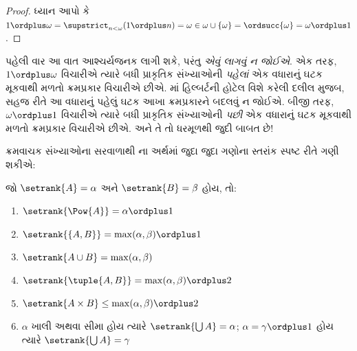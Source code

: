\begin{proof}
ધ્યાન આપો કે $1 \ordplus  \omega = \supstrict_{n < \omega} (1 \ordplus n)
= \omega \in \omega \cup \{\omega\} = \ordsucc{\omega} = \omega
\ordplus  1$.
\end{proof}
\noindent
પહેલી વાર આ વાત આશ્ચર્યજનક લાગી શકે, પરંતુ
\emph{એવું લાગવું ન જોઈએ}. એક તરફ,
$1 \ordplus  \omega$ વિચારીએ ત્યારે બધી પ્રાકૃતિક
સંખ્યાઓની \emph{પહેલાં} એક વધારાનું ઘટક મૂકવાથી
મળતો ક્રમપ્રકાર વિચારીએ છીએ.
માં હિલ્બર્ટની હોટેલ
વિશે કરેલી દલીલ મુજબ, સહજ રીતે આ વધારાનું પહેલું
ઘટક આખા ક્રમપ્રકારને બદલવું ન જોઈએ. બીજી તરફ,
$\omega \ordplus  1$ વિચારીએ ત્યારે બધી પ્રાકૃતિક
સંખ્યાઓની \emph{પછી} એક વધારાનું ઘટક મૂકવાથી
મળતો ક્રમપ્રકાર વિચારીએ છીએ. અને તે તો ધરમૂળથી
જુદી બાબત છે!
\endgroup

\begingroup
\makeatletter{}\makeatother

\label{guunit:OLP-0577}


ક્રમવાચક સંખ્યાઓના સરવાળાથી
ના અર્થમાં જુદા જુદા
ગણોના સ્તરાંક સ્પષ્ટ રીતે ગણી શકીએ:

\begin{lem}
જો $\setrank{A} = \alpha$ અને $\setrank{B} = \beta$ હોય, તો:
\begin{enumerate}
	\item{} $\setrank{\Pow{A}} = \alpha\ordplus 1$
	\item{} $\setrank{\{A, B\}} = \max(\alpha,
	\beta) \ordplus 1$
	\item{} $\setrank{A \cup B} = \max(\alpha,
	\beta)$
	\item{} $\setrank{\tuple{A,B}} = \max(\alpha,
	\beta) \ordplus  2$
	\item{} $\setrank{A \times B} \leq \max(\alpha,
	\beta) \ordplus  2$
	\item{} $\alpha$ ખાલી અથવા સીમા
	હોય ત્યારે $\setrank{\bigcup A} = \alpha$;
	$\alpha = \gamma\ordplus 1$ હોય ત્યારે
	$\setrank{\bigcup A} = \gamma$
\end{enumerate}
\end{lem}

